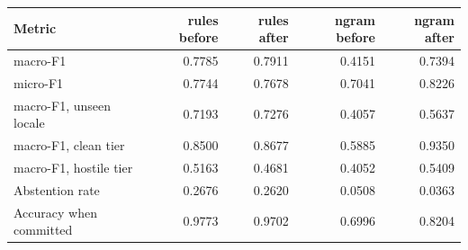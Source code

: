 \begingroup\small\setlength{\tabcolsep}{4pt}
\begin{tabular}{lrrrr}
\toprule
\textbf{Metric} & \textbf{rules before} & \textbf{rules after} & \textbf{ngram before} & \textbf{ngram after} \\
\midrule
macro-F1 & 0.7785 & 0.7911 & 0.4151 & 0.7394 \\  %
micro-F1 & 0.7744 & 0.7678 & 0.7041 & 0.8226 \\  %
macro-F1, unseen locale & 0.7193 & 0.7276 & 0.4057 & 0.5637 \\  %
macro-F1, clean tier & 0.8500 & 0.8677 & 0.5885 & 0.9350 \\  %
macro-F1, hostile tier & 0.5163 & 0.4681 & 0.4052 & 0.5409 \\  %
Abstention rate & 0.2676 & 0.2620 & 0.0508 & 0.0363 \\  %
Accuracy when committed & 0.9773 & 0.9702 & 0.6996 & 0.8204 \\  %
\bottomrule
\end{tabular}
